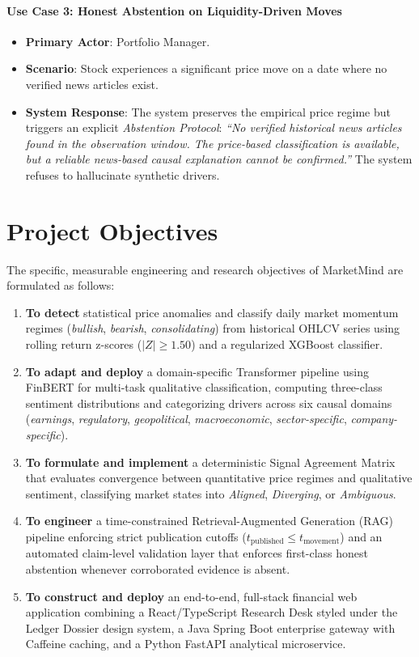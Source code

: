 \documentclass{article}
\begin{document}
	\paragraph{Use Case 3: Honest Abstention on Liquidity-Driven Moves}
	\begin{itemize}
		\item \textbf{Primary Actor}: Portfolio Manager.
		\item \textbf{Scenario}: Stock experiences a significant price move on a date where no verified news articles exist.
		\item \textbf{System Response}: The system preserves the empirical price regime but triggers an explicit \textit{Abstention Protocol}: \textit{``No verified historical news articles found in the observation window. The price-based classification is available, but a reliable news-based causal explanation cannot be confirmed.''} The system refuses to hallucinate synthetic drivers.
	\end{itemize}

	\pagebreak
	\section{Project Objectives}

	The specific, measurable engineering and research objectives of MarketMind are formulated as follows:
	\begin{enumerate}
		\item \textbf{To detect} statistical price anomalies and classify daily market momentum regimes (\textit{bullish}, \textit{bearish}, \textit{consolidating}) from historical OHLCV series using rolling return z-scores ($|Z| \ge 1.50$) and a regularized XGBoost classifier.
		\item \textbf{To adapt and deploy} a domain-specific Transformer pipeline using FinBERT for multi-task qualitative classification, computing three-class sentiment distributions and categorizing drivers across six causal domains (\textit{earnings}, \textit{regulatory}, \textit{geopolitical}, \textit{macroeconomic}, \textit{sector-specific}, \textit{company-specific}).
		\item \textbf{To formulate and implement} a deterministic Signal Agreement Matrix that evaluates convergence between quantitative price regimes and qualitative sentiment, classifying market states into \textit{Aligned}, \textit{Diverging}, or \textit{Ambiguous}.
		\item \textbf{To engineer} a time-constrained Retrieval-Augmented Generation (RAG) pipeline enforcing strict publication cutoffs ($t_{\text{published}} \le t_{\text{movement}}$) and an automated claim-level validation layer that enforces first-class honest abstention whenever corroborated evidence is absent.
		\item \textbf{To construct and deploy} an end-to-end, full-stack financial web application combining a React/TypeScript Research Desk styled under the Ledger Dossier design system, a Java Spring Boot enterprise gateway with Caffeine caching, and a Python FastAPI analytical microservice.
	\end{enumerate}
\end{document}
